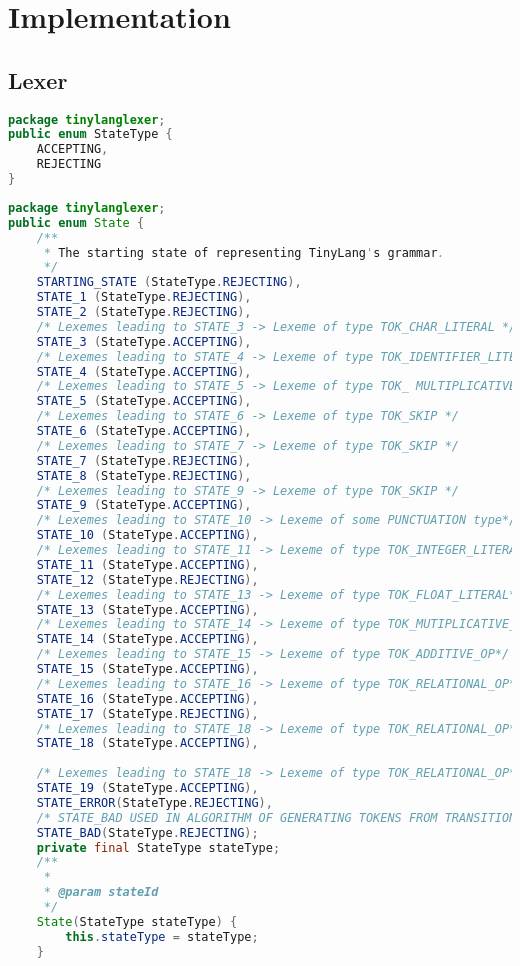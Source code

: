 
\chapter{Implementation}
\section{Lexer}
\begin{lstlisting}[basicstyle=\miniscule,language=Java, caption= State type]
package tinylanglexer;
public enum StateType {
	ACCEPTING,
	REJECTING
}
\end{lstlisting}
\begin{lstlisting}[basicstyle=\miniscule,language=Java,caption=tinylang's dfsa states,label=listing:states enum]
package tinylanglexer;
public enum State {
	/**
	 * The starting state of representing TinyLang's grammar.
	 */
	STARTING_STATE (StateType.REJECTING),
	STATE_1 (StateType.REJECTING),
	STATE_2 (StateType.REJECTING),
	/* Lexemes leading to STATE_3 -> Lexeme of type TOK_CHAR_LITERAL */
	STATE_3 (StateType.ACCEPTING),
	/* Lexemes leading to STATE_4 -> Lexeme of type TOK_IDENTIFIER_LITERAL or other KEYWORD type */
	STATE_4 (StateType.ACCEPTING),
	/* Lexemes leading to STATE_5 -> Lexeme of type TOK_ MULTIPLICATIVE_OP[*/	
	STATE_5 (StateType.ACCEPTING), 
	/* Lexemes leading to STATE_6 -> Lexeme of type TOK_SKIP */	
	STATE_6 (StateType.ACCEPTING),
	/* Lexemes leading to STATE_7 -> Lexeme of type TOK_SKIP */	
	STATE_7 (StateType.REJECTING),
	STATE_8 (StateType.REJECTING),
	/* Lexemes leading to STATE_9 -> Lexeme of type TOK_SKIP */	
	STATE_9 (StateType.ACCEPTING),
	/* Lexemes leading to STATE_10 -> Lexeme of some PUNCTUATION type*/	
	STATE_10 (StateType.ACCEPTING),
	/* Lexemes leading to STATE_11 -> Lexeme of type TOK_INTEGER_LITERAL*/	
	STATE_11 (StateType.ACCEPTING),
	STATE_12 (StateType.REJECTING),
	/* Lexemes leading to STATE_13 -> Lexeme of type TOK_FLOAT_LITERAL*/	
	STATE_13 (StateType.ACCEPTING),
	/* Lexemes leading to STATE_14 -> Lexeme of type TOK_MUTIPLICATIVE_OP or TOK_ADDITIVE_OP*/	
	STATE_14 (StateType.ACCEPTING),
	/* Lexemes leading to STATE_15 -> Lexeme of type TOK_ADDITIVE_OP*/	
	STATE_15 (StateType.ACCEPTING),
	/* Lexemes leading to STATE_16 -> Lexeme of type TOK_RELATIONAL_OP*/	
	STATE_16 (StateType.ACCEPTING),
	STATE_17 (StateType.REJECTING),
	/* Lexemes leading to STATE_18 -> Lexeme of type TOK_RELATIONAL_OP*/	
	STATE_18 (StateType.ACCEPTING),
	
	/* Lexemes leading to STATE_18 -> Lexeme of type TOK_RELATIONAL_OP*/	
	STATE_19 (StateType.ACCEPTING),
	STATE_ERROR(StateType.REJECTING),
	/* STATE_BAD USED IN ALGORITHM OF GENERATING TOKENS FROM TRANSITION TABLE */
	STATE_BAD(StateType.REJECTING);
	private final StateType stateType;
	/**
	 * 
	 * @param stateId
	 */
	State(StateType stateType) {
		this.stateType = stateType;
	}
	

\end{lstlisting}
